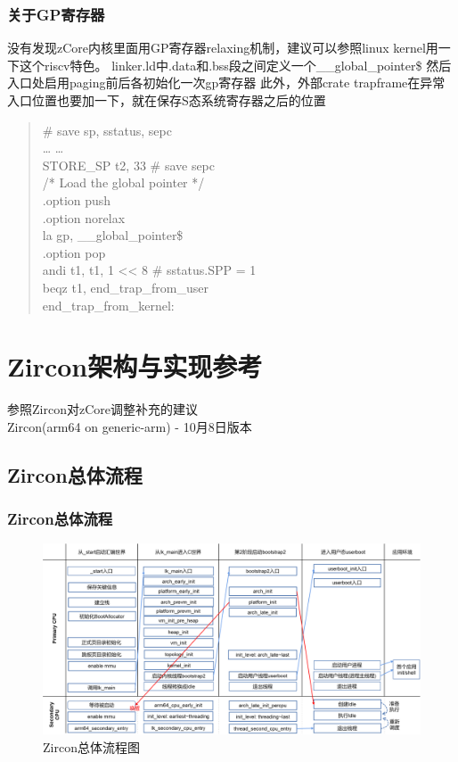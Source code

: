 \documentclass[
8pt, %
]{beamer}
\begin{document}
	\begin{frame}
		\frametitle{关于GP寄存器}
		没有发现zCore内核里面用GP寄存器relaxing机制，建议可以参照linux kernel用一下这个riscv特色。
		linker.ld中.data和.bss段之间定义一个\_\_global\_pointer\$
		然后入口处启用paging前后各初始化一次gp寄存器
		此外，外部crate trapframe在异常入口位置也要加一下，就在保存S态系统寄存器之后的位置
		\begin{quote}
			\# save sp, sstatus, sepc\\
			… …\\
			STORE\_SP t2, 33         \# save sepc\\
			\vspace {8pt} 
			/* Load the global pointer */\\
			.option push\\
			.option norelax\\
			la gp, \_\_global\_pointer\$\\
			.option pop\\
			\vspace {8pt} 
			andi t1, t1, 1 << 8     \# sstatus.SPP = 1\\
			beqz t1, end\_trap\_from\_user\\
			end\_trap\_from\_kernel:
		\end{quote}
	\end{frame}

	\section{Zircon架构与实现参考}
	
	\begin{frame}
		\begin{center}
			{\LARGE 参照Zircon对zCore调整补充的建议\\}
			\bigskip\bigskip
			{\large Zircon(arm64 on generic-arm) - 10月8日版本}
		\end{center}
	\end{frame}

	\subsection{Zircon总体流程}

	\begin{frame}
		\frametitle{Zircon总体流程}
		\begin{figure}
			\includegraphics[width=1.0\linewidth]{zircon_flow.png}
			\caption{Zircon总体流程图}
		\end{figure}
	\end{frame}
\end{document}
